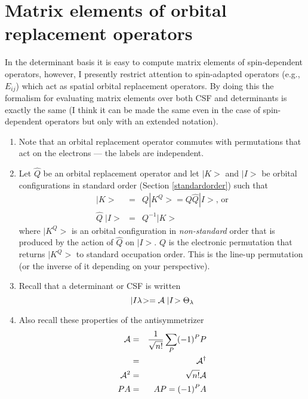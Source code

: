 \section{Matrix elements of orbital replacement operators}

In the determinant basis it is easy to compute matrix elements of
spin-dependent operators, however, I presently restrict attention to
spin-adapted operators (e.g., $E_{ij}$) which act as spatial orbital
replacement operators.  By doing this the formalism for evaluating
matrix elements over both CSF and determinants is exactly the same (I
think it can be made the same even in the case of spin-dependent
operators but only with an extended notation).

\begin{enumerate}
\item Note that an orbital replacement operator commutes with
permutations that act on the electrons --- the labels are independent.

\item Let $\hat{Q}$ be an orbital replacement operator and let $|K\! >$
and $|I\! >$ be orbital configurations in standard order (Section
\ref{standardorder}) such that
\begin{eqnarray}
  |K\! > & = & Q |K^Q\! > =  Q \hat{Q} |I\! > \mbox{, or}
\label{qik1} \\
  \hat{Q} \; |I \! > & = & Q^{-1} |K \! > \label{qik}
\end{eqnarray}
where $|K^Q\! >$ is an orbital configuration in {\em non-standard}
order that is produced by the action of $\hat{Q}$ on $|I\! >$.  $Q$ is
the electronic permutation that returns $|K^Q\! >$ to standard
occupation order.  This is the line-up permutation (or the inverse of
it depending on your perspective).

\item Recall that a determinant or CSF is written 
\begin{equation}
|I \lambda\! > = {\cal A} \; |I\! > \Theta_{\lambda} \label{csfdefn}
\end{equation}

\item Also recall these properties of the antisymmetrizer
\begin{eqnarray}
 {\cal A} & = & \frac{1}{\sqrt{n!}} \sum_P (-1)^P P \\
          & = & {\cal A}^{\dagger} \\
 {\cal A}^2 & = & \sqrt{n!} {\cal A} \\
     PA & = & AP = (-1)^P A \label{paap}
\end{eqnarray}


\end{enumerate}
